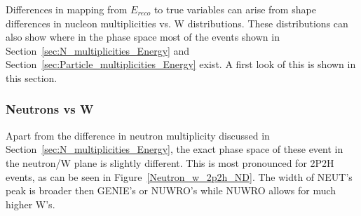 \documentclass[12pt]{article}
\begin{document}
Differences in mapping from $E_{reco}$ to true variables can arise from shape differences in nucleon multiplicities vs. W distributions. 
These distributions can also show where in the phase space most of the events shown in Section~\ref{sec:N_multiplicities_Energy} and Section~\ref{sec:Particle_multiplicities_Energy} exist.  A first look of this is shown in this section.

\subsubsection{Neutrons vs W}

Apart from the difference in neutron multiplicity discussed in Section~\ref{sec:N_multiplicities_Energy}, the exact phase space of these event in the neutron/W plane is slightly different.  
This is most pronounced for 2P2H events, as can be seen in Figure~\ref{Neutron_w_2p2h_ND}. 
The width of NEUT's peak is broader then GENIE's or NUWRO's while NUWRO allows for much higher W's.
\end{document}
